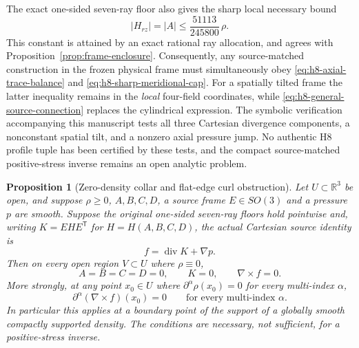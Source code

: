 \documentclass[11pt,a4paper]{article}
\theoremstyle{plain}
\newtheorem{proposition}[theorem]{Proposition}
\theoremstyle{definition}
\newcommand{\R}{\mathbb{R}}
\newcommand{\diver}{\operatorname{div}}
\begin{document}
The exact one-sided seven-ray floor also gives the sharp local
necessary bound
\begin{equation}\label{eq:h8-sharp-meridional-cap}
 |H_{rz}|=|A|\le\frac{51113}{245800}\,\rho.
\end{equation}
This constant is attained by an exact rational ray allocation,
and agrees with Proposition~\ref{prop:frame-enclosure}.
Consequently, any source-matched construction in the frozen
physical frame must simultaneously obey
\eqref{eq:h8-axial-trace-balance} and
\eqref{eq:h8-sharp-meridional-cap}. For a spatially tilted frame
the latter inequality remains in the \emph{local} four-field
coordinates, while \eqref{eq:h8-general-source-connection}
replaces the cylindrical expression. The symbolic verification
accompanying this manuscript tests all three Cartesian divergence
components, a nonconstant spatial tilt, and a nonzero axial pressure
jump. No authentic H8 profile tuple has been certified by these
tests, and the compact source-matched positive-stress inverse
remains an open analytic problem.

\begin{proposition}[Zero-density collar and flat-edge curl obstruction]
\label{prop:zero-density-curl}
Let $U\subset\R^3$ be open, and suppose $\rho\ge0$,
$A,B,C,D$, a source frame $E\in SO(3)$ and a pressure $p$ are
smooth. Suppose the original one-sided seven-ray floors hold
pointwise and, writing $K=EHE^{\mathsf T}$ for
$H=H(A,B,C,D)$, the actual Cartesian source identity is
\begin{equation}\label{eq:collar-source-identity}
 f=\diver K+\nabla p.
\end{equation}
Then on every open region $V\subset U$ where $\rho\equiv0$,
\begin{equation}\label{eq:collar-curl-zero}
 A=B=C=D=0,\qquad K=0,\qquad \nabla\times f=0.
\end{equation}
More strongly, at any point $x_0\in U$ where
$\partial^\alpha\rho(x_0)=0$ for every multi-index $\alpha$,
\begin{equation}\label{eq:collar-flat-curl}
 \partial^\alpha(\nabla\times f)(x_0)=0
 \qquad\text{for every multi-index }\alpha.
\end{equation}
In particular this applies at a boundary point of the support
of a globally smooth compactly supported density. The conditions
are necessary, not sufficient, for a positive-stress inverse.
\end{proposition}
\end{document}
